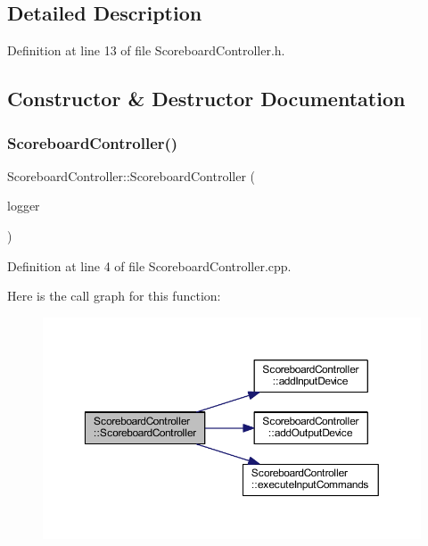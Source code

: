 \subsection{Detailed Description}


Definition at line 13 of file Scoreboard\+Controller.\+h.



\subsection{Constructor \& Destructor Documentation}
\mbox{\label{class_scoreboard_controller_a91b4c81d76de5840fa48ec794ba2ee08}} 
\subsubsection{\texorpdfstring{Scoreboard\+Controller()}{ScoreboardController()}}
{\footnotesize\ttfamily Scoreboard\+Controller\+::\+Scoreboard\+Controller (\begin{DoxyParamCaption}\item[{shared\+\_\+ptr$<$ \hyperlink{class_i_logger}{I\+Logger} $>$}]{logger }\end{DoxyParamCaption})}



Definition at line 4 of file Scoreboard\+Controller.\+cpp.

Here is the call graph for this function\+:\nopagebreak
\begin{figure}[H]
\begin{center}
\leavevmode
\includegraphics[width=350pt]{class_scoreboard_controller_a91b4c81d76de5840fa48ec794ba2ee08_cgraph}
\end{center}
\end{figure}


